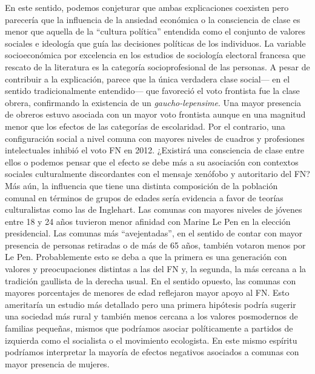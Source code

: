 En este sentido, podemos conjeturar que ambas explicaciones coexisten pero parecería que la influencia de la ansiedad económica o la consciencia de clase es menor que aquella de la ``cultura política'' entendida como el conjunto de valores sociales e ideología que guía las decisiones políticas de los individuos. La variable socioeconómica por excelencia en los estudios de sociología electoral francesa que rescato de la literatura es la categoría socioprofesional de las personas. A pesar de contribuir a la explicación, parece que la única verdadera clase social--- en el sentido tradicionalmente entendido--- que favoreció el voto frontista fue la clase obrera, confirmando la existencia de un \textit{gaucho-lepensime}. Una mayor presencia de obreros estuvo asociada con un mayor voto frontista aunque en una magnitud menor que los efectos de las categorías de escolaridad. Por el contrario, una configuración social a nivel comuna con mayores niveles de cuadros y profesiones intelectuales inhibió el voto FN en 2012. ¿Existirá una consciencia de clase entre ellos o podemos pensar que el efecto se debe más a su asociación con contextos sociales culturalmente discordantes con el mensaje xenófobo y autoritario del FN?\\ 

Más aún, la influencia que tiene una distinta composición de la población comunal en términos de grupos de edades sería evidencia a favor de teorías culturalistas como las de Inglehart. Las comunas con mayores niveles de jóvenes entre 18 y 24 años tuvieron menor afinidad con Marine Le Pen en la elección presidencial. Las comunas más ``avejentadas'', en el sentido de contar con mayor presencia de personas retiradas o de más de 65 años, también votaron menos por Le Pen. Probablemente esto se deba a que la primera es una generación con valores y preocupaciones distintas a las del FN y, la segunda, la más cercana a la tradición gaullista de la derecha usual. En el sentido opuesto, las comunas con mayores porcentajes de menores de edad reflejaron mayor apoyo al FN. Esto ameritaría un estudio más detallado pero una primera hipótesis podría sugerir una sociedad más rural y también menos cercana a los valores posmodernos de familias pequeñas, mismos que podríamos asociar políticamente a partidos de izquierda como el socialista o el movimiento ecologista. En este mismo espíritu podríamos interpretar la mayoría de efectos negativos asociados a comunas con mayor presencia de mujeres.\\

